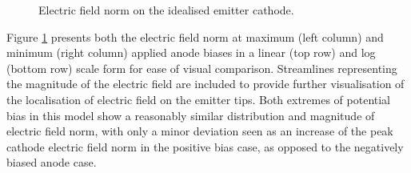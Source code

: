 \begin{refsection}
\begin{figure}[H]
    \caption{Electric field norm on the idealised emitter cathode.}
    \label{fig:electric_field_norm}
\end{figure}

Figure \ref{fig:electric_field_norm} presents both the electric field norm at maximum (left column) and minimum (right column) applied anode biases in a linear (top row) and log (bottom row) scale form for ease of visual comparison. Streamlines representing the magnitude of the electric field are included to provide further visualisation of the localisation of electric field on the emitter tips. Both extremes of potential bias in this model show a reasonably similar distribution and magnitude of electric field norm, with only a minor deviation seen as an increase of the peak cathode electric field norm in the positive bias case, as opposed to the negatively biased anode case. 


\end{refsection}
